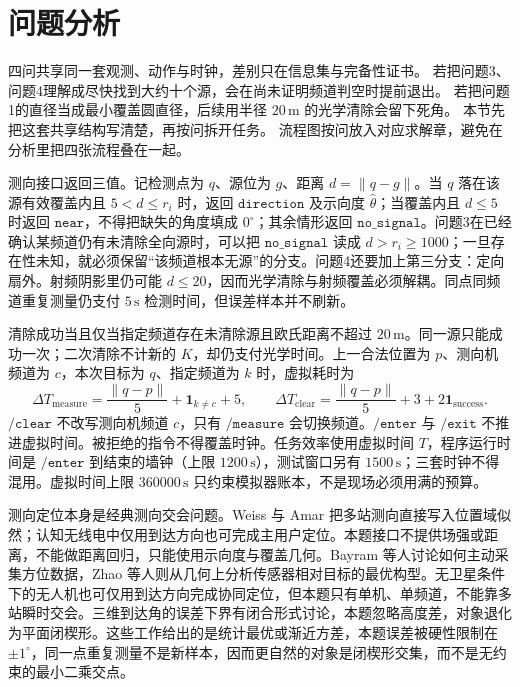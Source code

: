 \section{问题分析}

四问共享同一套观测、动作与时钟，差别只在信息集与完备性证书。
若把问题3、问题4理解成尽快找到大约十个源，会在尚未证明频道判空时提前退出。
若把问题1的直径当成最小覆盖圆直径，后续用半径 $20\,\mathrm{m}$ 的光学清除会留下死角。
本节先把这套共享结构写清楚，再按问拆开任务。
流程图按问放入对应求解章，避免在分析里把四张流程叠在一起。

测向接口返回三值。记检测点为 $q$、源位为 $g$、距离 $d=\|q-g\|$。当 $q$ 落在该源有效覆盖内且 $5<d\le r_i$ 时，返回 $\mathtt{direction}$ 及示向度 $\hat\theta$；当覆盖内且 $d\le 5$ 时返回 $\mathtt{near}$，不得把缺失的角度填成 $0^\circ$；其余情形返回 $\mathtt{no\_signal}$。问题3在已经确认某频道仍有未清除全向源时，可以把 $\mathtt{no\_signal}$ 读成 $d>r_i\ge 1000$；一旦存在性未知，就必须保留“该频道根本无源”的分支。问题4还要加上第三分支：定向扇外。射频阴影里仍可能 $d\le 20$，因而光学清除与射频覆盖必须解耦。同点同频道重复测量仍支付 $5\,\mathrm{s}$ 检测时间，但误差样本并不刷新。

清除成功当且仅当指定频道存在未清除源且欧氏距离不超过 $20\,\mathrm{m}$。同一源只能成功一次；二次清除不计新的 $K$，却仍支付光学时间。上一合法位置为 $p$、测向机频道为 $c$，本次目标为 $q$、指定频道为 $k$ 时，虚拟耗时为
\begin{equation}
\Delta T_{\mathrm{measure}}=\frac{\|q-p\|}{5}+\mathbf{1}_{k\neq c}+5,\qquad
\Delta T_{\mathrm{clear}}=\frac{\|q-p\|}{5}+3+2\mathbf{1}_{\mathrm{success}}.
\end{equation}
$\mathtt{/clear}$ 不改写测向机频道 $c$，只有 $\mathtt{/measure}$ 会切换频道。$\mathtt{/enter}$ 与 $\mathtt{/exit}$ 不推进虚拟时间。被拒绝的指令不得覆盖时钟。任务效率使用虚拟时间 $T$，程序运行时间是 $\mathtt{/enter}$ 到结束的墙钟（上限 $1200\,\mathrm{s}$），测试窗口另有 $1500\,\mathrm{s}$；三套时钟不得混用。虚拟时间上限 $360000\,\mathrm{s}$ 只约束模拟器账本，不是现场必须用满的预算。

测向定位本身是经典测向交会问题。Weiss 与 Amar 把多站测向直接写入位置域似然；认知无线电中仅用到达方向也可完成主用户定位。本题接口不提供场强或距离，不能做距离回归，只能使用示向度与覆盖几何。Bayram 等人讨论如何主动采集方位数据，Zhao 等人则从几何上分析传感器相对目标的最优构型。无卫星条件下的无人机也可仅用到达方向完成协同定位，但本题只有单机、单频道，不能靠多站瞬时交会。三维到达角的误差下界有闭合形式讨论，本题忽略高度差，对象退化为平面闭楔形。这些工作给出的是统计最优或渐近方差，本题误差被硬性限制在 $\pm 1^\circ$，同一点重复测量不是新样本，因而更自然的对象是闭楔形交集，而不是无约束的最小二乘交点。

